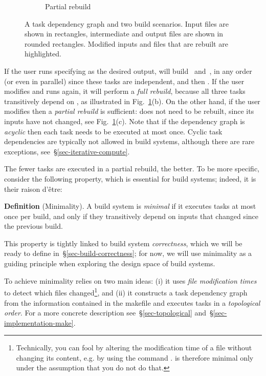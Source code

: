 \begin{figure}
\begin{subfigure}[b]{0.32\linewidth}
\caption{Partial rebuild}
\end{subfigure}
\caption{A task dependency graph and two build scenarios. Input files are shown
in rectangles, intermediate and output files are shown in rounded rectangles.
Modified inputs and files that are rebuilt are highlighted.
\label{fig-make}}
\end{figure}

If the user runs \Make specifying  as the desired output, \Make
will build~ and~, in any order (or even in parallel) since these tasks are
independent, and then . If the user modifies  and runs
\Make again, it will perform a \emph{full rebuild}, because all three tasks
transitively depend on , as illustrated in Fig.~\ref{fig-make}(b).
On the other hand, if the user modifies  then a \emph{partial
rebuild} is sufficient:  does not need to be rebuilt, since its
inputs have not changed, see Fig.~\ref{fig-make}(c). Note that if the dependency
graph is \emph{acyclic} then each task needs to be executed at most once. Cyclic
task dependencies are typically not allowed in build systems, although there are
rare exceptions, see~\S\ref{sec-iterative-compute}.

The fewer tasks are executed in a partial rebuild, the better. To be more
specific, consider the following property, which is essential for build systems;
indeed, it is their raison d'\^etre:

\vspace{2mm}
\textbf{Definition} (Minimality). A build system is \emph{minimal} if it
executes tasks at most once per build, and only if they transitively depend on
inputs that changed since the previous build.\label{def-minimal}
\vspace{2mm}

\noindent
This property is tightly linked to build system \emph{correctness}, which we
will be ready to define in~\S\ref{sec-build-correctness}; for now, we will use
minimality as a guiding principle when exploring the design space of build
systems.

To achieve minimality \Make relies on two main ideas: (i) it uses \emph{file
modification times} to detect which files changed\footnote{Technically, you
can fool \Make by altering the modification time of a file without changing its
content, e.g. by using the command . \Make is therefore minimal only
under the assumption that you do not do that.}, and (ii) it constructs a task
dependency graph from the information contained in the makefile and executes
tasks in a \emph{topological order}. For a more concrete description
see~\S\ref{sec-topological} and~\S\ref{sec-implementation-make}.

